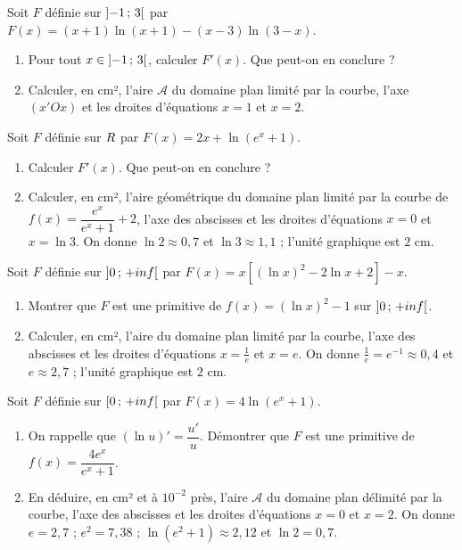 \begin{annales}
Soit $F$ définie sur $\left]-1\,;\,3\right[$ par
$F(x) = (x+1)\ln(x+1)-(x-3)\ln(3-x)$.
\begin{enumerate}[label=\textbf{\alph*)}, leftmargin=*, itemsep=0.15em]
  \item Pour tout $x \in \left]-1\,;\,3\right[$, calculer $F'(x)$. Que peut-on
        en conclure ?
  \item Calculer, en cm², l'aire $\mathcal A$ du domaine plan limité par la
        courbe, l'axe $(x'Ox)$ et les droites d'équations $x = 1$ et
        $x = 2$.
\end{enumerate}

Soit $F$ définie sur $R$ par $F(x) = 2x+\ln\left(e^{x}+1\right)$.
\begin{enumerate}[label=\textbf{\alph*)}, leftmargin=*, itemsep=0.15em]
  \item Calculer $F'(x)$. Que peut-on en conclure ?
  \item Calculer, en cm², l'aire géométrique du domaine plan limité par la
        courbe de $f(x) = \dfrac{e^{x}}{e^{x}+1}+2$, l'axe des abscisses et
        les droites d'équations $x = 0$ et $x = \ln3$. On donne
        $\ln2 \approx 0{,}7$ et $\ln3 \approx 1{,}1$ ; l'unité graphique est
        $2$ cm.
\end{enumerate}

Soit $F$ définie sur $\left]0\,;\,+inf\right[$ par
$F(x) = x\left[\left(\ln x\right)^{2}-2\ln x+2\right]-x$.
\begin{enumerate}[label=\textbf{\alph*)}, leftmargin=*, itemsep=0.15em]
  \item Montrer que $F$ est une primitive de
        $f(x) = \left(\ln x\right)^{2}-1$ sur $\left]0\,;\,+inf\right[$.
  \item Calculer, en cm², l'aire du domaine plan limité par la courbe, l'axe
        des abscisses et les droites d'équations $x = \frac1e$ et $x = e$.
        On donne $\frac1e = e^{-1} \approx 0{,}4$ et $e \approx 2{,}7$ ;
        l'unité graphique est $2$ cm.
\end{enumerate}

Soit $F$ définie sur $\left[0\,;\,+inf\right[$ par
$F(x) = 4\ln\left(e^{x}+1\right)$.
\begin{enumerate}[label=\textbf{\alph*)}, leftmargin=*, itemsep=0.15em]
  \item On rappelle que $\left(\ln u\right)' = \dfrac{u'}{u}$. Démontrer que
        $F$ est une primitive de $f(x) = \dfrac{4e^{x}}{e^{x}+1}$.
  \item En déduire, en cm² et à $10^{-2}$ près, l'aire $\mathcal A$ du
        domaine plan délimité par la courbe, l'axe des abscisses et les
        droites d'équations $x = 0$ et $x = 2$. On donne $e = 2{,}7$ ;
        $e^{2} = 7{,}38$ ; $\ln\left(e^{2}+1\right) \approx 2{,}12$ et
        $\ln2 = 0{,}7$.
\end{enumerate}


\end{annales}
